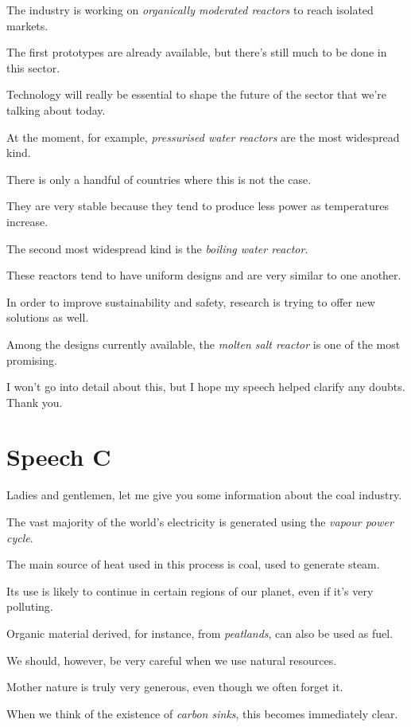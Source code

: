 The industry is working on \textit{organically moderated reactors} to reach isolated markets.

The first prototypes are already available, but there's still much to be done in this sector.

\ex Technology will really be essential to shape the future of the sector that we're talking about today.

At the moment, for example, \textit{pressurised water reactors} are the most widespread kind.

There is only a handful of countries where this is not the case.

\ex They are very stable because they tend to produce less power as temperatures increase.

The second most widespread kind is the \textit{boiling water reactor}.

These reactors tend to have uniform designs and are very similar to one another.

\ex In order to improve sustainability and safety, research is trying to offer new solutions as well.

Among the designs currently available, the \textit{molten salt reactor} is one of the most promising.

I won't go into detail about this, but I hope my speech helped clarify any doubts.
Thank you.
\z

\chapter{Speech C}\largerpage

\ea Ladies and gentlemen, let me give you some information about the coal industry.

The vast majority of the world's electricity is generated using the \textit{vapour power cycle}.

The main source of heat used in this process is coal, used to generate steam.

\ex Its use is likely to continue in certain regions of our planet, even if it's very polluting.

Organic material derived, for instance, from \textit{peatlands}, can also be used as fuel.

We should, however, be very careful when we use natural resources.

\ex Mother nature is truly very generous, even though we often forget it.

When we think of the existence of \textit{carbon sinks}, this becomes immediately clear.

